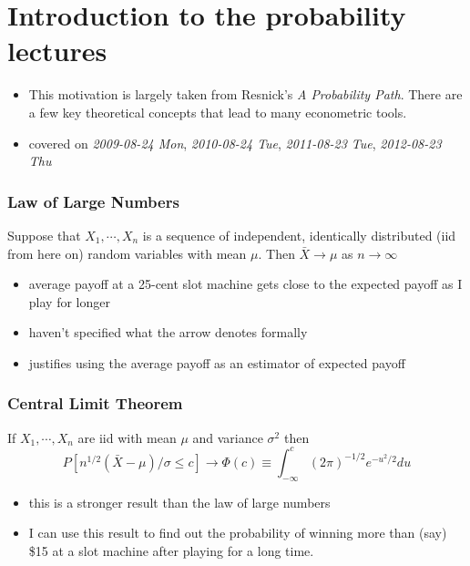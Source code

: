 
\part{Introduction to the probability lectures}

\begin{itemize}
\item This motivation is largely taken from Resnick's \emph{A Probability      Path}.  There are a few key theoretical concepts that lead to
     many econometric tools.
\item covered on \textit{2009-08-24 Mon}, \textit{2010-08-24 Tue}, \textit{2011-08-23 Tue},
     \textit{2012-08-23 Thu}
\end{itemize}
\section{Law of Large Numbers}
\label{sec-1}

     Suppose that $X_1,\cdots,X_n$ is a sequence of independent,
     identically distributed (iid from here on) random variables with
     mean $\mu$.  Then $\bar X \to \mu$ as $n \to \infty$
\begin{itemize}
\item average payoff at a 25-cent slot machine gets close to the
       expected payoff as I play for longer
\item haven't specified what the arrow denotes formally
\item justifies using the average payoff as an estimator of expected
       payoff
\end{itemize}
\section{Central Limit Theorem}
\label{sec-2}

     If $X_1,\cdots,X_n$ are iid with mean $\mu$ and variance $\sigma$$^2$
     then
     \[ P[n^{1/2}(\bar X - \mu)/\sigma \leq c] \to \Phi(c)
      \equiv \int_{-\infty}^c (2\pi)^{-1/2} e^{-u^2/2} du
     \]
\begin{itemize}
\item this is a stronger result than the law of large numbers
\item I can use this result to find out the probability of winning more
       than (say) \$15 at a slot machine after playing for a long time.
\end{itemize}

